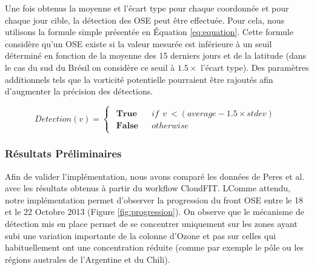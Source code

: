 Une fois obtenus la moyenne et l'écart type pour chaque coordonnée et pour chaque jour cible, la détection des OSE peut être effectuée.  Pour cela, nous utilisons la formule simple présentée en Équation \ref{eq:equation}. Cette formule considère qu'un OSE existe si la valeur mesurée est inférieure à un seuil déterminé en fonction de la moyenne des 15 derniers jours et de la latitude (dans le cas du sud du Brésil on considère ce seuil à $1.5 \times$ l'écart type). Des paramètres additionnels tels que la vorticité potentielle pourraient être rajoutés afin d'augmenter la précision des détections.

\begin{equation}
Detection(v)=\left\{ \begin{array}{c}
\begin{array}{lll}
\textbf{True} & &if \:\: v \:< (average - 1.5\times stdev)\\
\textbf{False} & &otherwise\end{array}\end{array}\right.
\label{eq:equation}
\end{equation}



\subsubsection{Résultats Préliminaires}

Afin de valider l'implémentation, nous avons comparé les données de Peres et al.\cite{Peres2013} avec les résultats obtenus à partir du workflow CloudFIT. LComme attendu, notre implémentation permet d'observer la progression du front OSE entre le 18 et le 22 Octobre 2013 (Figure \ref{fig:progression}). On observe que le mécanisme de détection mis en place permet de se concentrer uniquement sur les zones ayant subi une variation importante de la colonne d'Ozone et pas sur celles qui habituellement ont une concentration réduite (comme par exemple le pôle ou les régions australes de l'Argentine et du Chili). 

